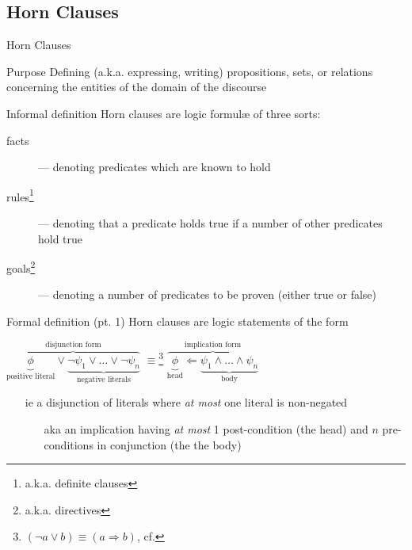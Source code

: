 \documentclass[presentation]{beamer}\mode<presentation>{\usetheme{AMSBolognaFC}}
\begin{document}
\subsection{Horn Clauses}

\begin{frame}[allowframebreaks]{Horn Clauses}
    \begin{block}{Purpose}\centering
        Defining (a.k.a. expressing, writing) \alert{propositions}, \alert{sets}, or \alert{relations} concerning the entities of the \alert{domain of the discourse}
    \end{block}
    \begin{block}{Informal definition}
        Horn clauses are logic formul\ae{} of three sorts:
        \begin{description}
            \item[facts] --- denoting predicates which are known to hold
            \item[rules\footnote{a.k.a. definite clauses}] --- denoting that a predicate holds true if a number of other predicates hold true
            \item[goals\footnote{a.k.a. directives}] --- denoting a number of predicates to be proven (either true or false)
        \end{description}
    \end{block}
    \begin{block}{Formal definition (pt. 1)}
        Horn clauses are logic statements of the form
        \begin{center}
            $\overbrace{\underbrace{\phi}_{\text{positive literal}} \vee \underbrace{\neg\psi_1 \vee \ldots \vee \neg \psi_n}_{\text{negative literals}}}^{\text{disjunction form}}$
            \qquad $\equiv$\footnote{$(\neg a \vee b) \equiv (a \Rightarrow b)$, cf. } \qquad
            $\overbrace{\underbrace{\phi}_{\text{head}} \Leftarrow \underbrace{\psi_1 \wedge \ldots \wedge \psi_n}_{\text{body}}}^\text{implication form}$
        \end{center}
        \begin{itemize}
            \item[ie] a \alert{disjunction} of \alert{literals} where \emph{at most} one literal is non-negated
            \begin{itemize}
                \item[aka] an \alert{implication} having \emph{at most} 1 post-condition (the \alert{head}) and $n$ pre-conditions in conjunction (the \alert{the body})

\end{itemize}
\end{itemize}
\end{block}
\end{frame}
\end{document}
